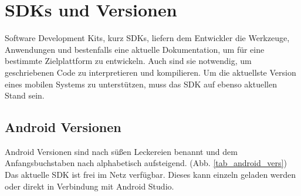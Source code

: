 \section{SDKs und Versionen}
Software Development Kits, kurz SDKs, liefern dem Entwickler die Werkzeuge, Anwendungen und bestenfalls eine aktuelle Dokumentation, um für eine bestimmte Zielplattform zu entwickeln. Auch sind sie notwendig, um geschriebenen Code zu interpretieren und kompilieren. Um die aktuellste Version eines mobilen Systems zu unterstützen, muss das SDK auf ebenso aktuellen Stand sein.
\clearpage 

\subsection{Android Versionen}
Android Versionen sind nach süßen Leckereien benannt und dem Anfangsbuchstaben nach alphabetisch aufsteigend. (Abb. \ref{tab_android_vers})
Das aktuelle SDK ist frei im Netz verfügbar. Dieses kann einzeln geladen werden oder direkt in Verbindung mit Android Studio.

